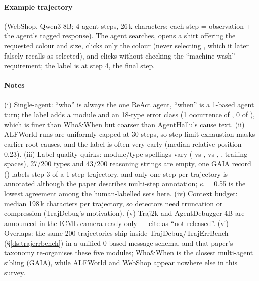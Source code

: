 \paragraph{Example trajectory}  (WebShop, Qwen3-8B; 4 agent steps, 26\,k characters; each step = observation + the agent's tagged response). The agent searches, opens a shirt offering the requested colour and size, clicks only the colour (never selecting , which it later falsely recalls as selected), and clicks  without checking the ``machine wash'' requirement; the label is  at step 4, the final step.


\paragraph{Notes} (i) Single-agent: ``who'' is always the one ReAct agent, ``when'' is a 1-based agent turn; the label adds a module and an 18-type error class (1 occurrence of , 0 of ), which is finer than Who\&When but coarser than AgentHallu's cause text. (ii) ALFWorld runs are uniformly capped at 30 steps, so step-limit exhaustion masks earlier root causes, and the label is often very early (median relative position 0.23). (iii) Label-quality quirks: module/type spellings vary ( vs ,  vs , , trailing spaces), 27/200 types and 43/200 reasoning strings are empty, one GAIA record () labels step 3 of a 1-step trajectory, and only one step per trajectory is annotated although the paper describes multi-step annotation; $\kappa$ = 0.55 is the lowest agreement among the human-labelled sets here. (iv) Context budget: median 198\,k characters per trajectory, so detectors need truncation or compression (TrajDebug's motivation). (v) Traj2k and AgentDebugger-4B are announced in the ICML camera-ready only --- cite as ``not released''. (vi) Overlaps: the same 200 trajectories ship inside TrajDebug/TrajErrBench (\S\ref{ds:trajerrbench}) in a unified 0-based message schema, and that paper's taxonomy re-organises these five modules; Who\&When is the closest multi-agent sibling (GAIA), while ALFWorld and WebShop appear nowhere else in this survey.
